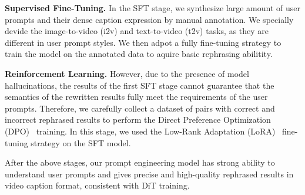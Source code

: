 \textbf{Supervised Fine-Tuning.} In the SFT stage, we synthesize large amount of user prompts and their dense caption expression by manual annotation. We specially devide the image-to-video (i2v) and text-to-video (t2v) tasks, as they are different in user prompt styles. We then adpot a fully fine-tuning strategy to train the model on the annotated data to aquire basic rephrasing abilitity.

\textbf{Reinforcement Learning.} However, due to the presence of model hallucinations, the results of the first SFT stage cannot guarantee that the semantics of the rewritten results fully meet the requirements of the user prompts. Therefore, we carefully collect a dataset of pairs with correct and incorrect rephrased results to perform the Direct Preference Optimization (DPO)~\cite{rafailov2023dpo,ji2024prompt} training. In this stage, we used the Low-Rank Adaptation (LoRA)~\cite{hu2022lora} fine-tuning strategy on the SFT model.

After the above stages, our prompt engineering model has strong ability to understand user prompts and gives precise and high-quality rephrased results in video caption format, consistent with DiT training.

